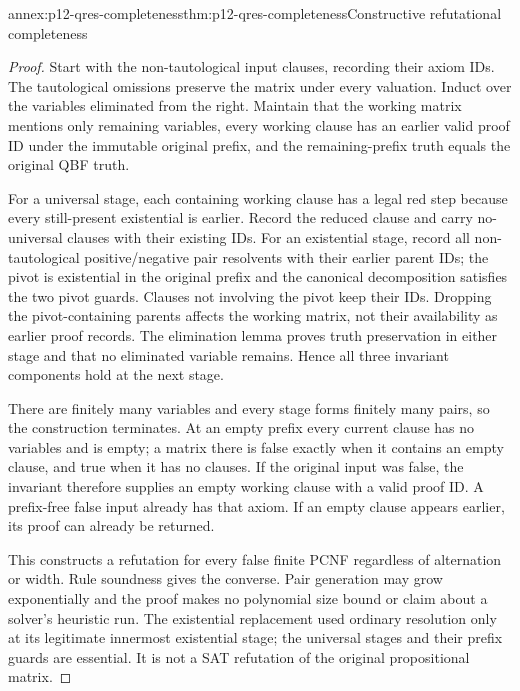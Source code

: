 \begin{annexitem}{annex:p12-qres-completeness}{thm:p12-qres-completeness}{Constructive refutational completeness}
\begin{proof}
Start with the non-tautological input clauses, recording their axiom IDs.
The tautological omissions preserve the matrix under every valuation.
Induct over the variables eliminated from the right.  Maintain that the
working matrix mentions only remaining variables, every working clause has
an earlier valid proof ID under the immutable original prefix, and the
remaining-prefix truth equals the original QBF truth.

For a universal stage, each containing working clause has a legal red step
because every still-present existential is earlier.  Record the reduced
clause and carry no-universal clauses with their existing IDs.  For an
existential stage, record all non-tautological positive/negative pair
resolvents with their earlier parent IDs; the pivot is existential in the
original prefix and the canonical decomposition satisfies the two pivot
guards.  Clauses not involving the pivot keep their IDs.  Dropping the
pivot-containing parents affects the working matrix, not their availability
as earlier proof records.  The elimination lemma proves truth preservation
in either stage and that no eliminated variable remains.  Hence all three
invariant components hold at the next stage.

There are finitely many variables and every stage forms finitely many pairs,
so the construction terminates.  At an empty prefix every current clause
has no variables and is empty; a matrix there is false exactly when it
contains an empty clause, and true when it has no clauses.  If the original
input was false, the invariant therefore supplies an empty working clause
with a valid proof ID.  A prefix-free false input already has that axiom.
If an empty clause appears earlier, its proof can already be returned.

This constructs a refutation for every false finite PCNF regardless of
alternation or width.  Rule soundness gives the converse.  Pair generation
may grow exponentially and the proof makes no polynomial size bound or
claim about a solver's heuristic run.  The existential replacement used
ordinary resolution only at its legitimate innermost existential stage;
the universal stages and their prefix guards are essential.  It is not a
SAT refutation of the original propositional matrix.
\end{proof}
\end{annexitem}

